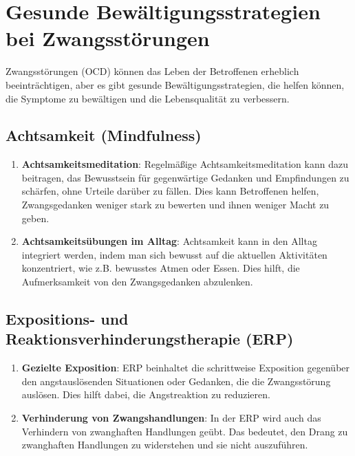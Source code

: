 \section{Gesunde Bewältigungsstrategien bei Zwangsstörungen}

Zwangsstörungen (OCD) können das Leben der Betroffenen erheblich beeinträchtigen, aber es gibt gesunde Bewältigungsstrategien, die helfen können, die Symptome zu bewältigen und die Lebensqualität zu verbessern.

\subsection{Achtsamkeit (Mindfulness)}

\begin{enumerate}
  \item \textbf{Achtsamkeitsmeditation}: Regelmäßige Achtsamkeitsmeditation kann dazu beitragen, das Bewusstsein für gegenwärtige Gedanken und Empfindungen zu schärfen, ohne Urteile darüber zu fällen. Dies kann Betroffenen helfen, Zwangsgedanken weniger stark zu bewerten und ihnen weniger Macht zu geben.
  
  \item \textbf{Achtsamkeitsübungen im Alltag}: Achtsamkeit kann in den Alltag integriert werden, indem man sich bewusst auf die aktuellen Aktivitäten konzentriert, wie z.B. bewusstes Atmen oder Essen. Dies hilft, die Aufmerksamkeit von den Zwangsgedanken abzulenken.
\end{enumerate}

\subsection{Expositions- und Reaktionsverhinderungstherapie (ERP)}

\begin{enumerate}
  \item \textbf{Gezielte Exposition}: ERP beinhaltet die schrittweise Exposition gegenüber den angstauslösenden Situationen oder Gedanken, die die Zwangsstörung auslösen. Dies hilft dabei, die Angstreaktion zu reduzieren.
  
  \item \textbf{Verhinderung von Zwangshandlungen}: In der ERP wird auch das Verhindern von zwanghaften Handlungen geübt. Das bedeutet, den Drang zu zwanghaften Handlungen zu widerstehen und sie nicht auszuführen.
\end{enumerate}

